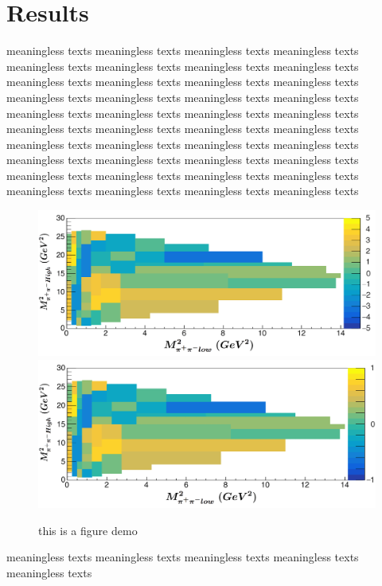 \documentclass[12pt, twoside, notitlepage, twocolumn]{article}
\begin{document}
        \section{Results}
        
        meaningless texts meaningless texts meaningless texts meaningless texts meaningless texts 
        meaningless texts meaningless texts meaningless texts meaningless texts meaningless texts 
        meaningless texts meaningless texts meaningless texts meaningless texts meaningless texts 
        meaningless texts meaningless texts meaningless texts meaningless texts meaningless texts 
        meaningless texts meaningless texts meaningless texts meaningless texts meaningless texts 
        meaningless texts meaningless texts meaningless texts meaningless texts meaningless texts 
        meaningless texts meaningless texts meaningless texts meaningless texts meaningless texts 
        meaningless texts meaningless texts meaningless texts meaningless texts meaningless texts 
        \begin{figure}[ht]
            \centering
            \includegraphics[scale=0.538]{LocalA.png}
            \includegraphics[scale=0.538]{LocalSig.png}
            \caption{this is a figure demo}
            \label{fig:label2}
        \end{figure}
        meaningless texts meaningless texts meaningless texts meaningless texts meaningless texts 
\end{document}
